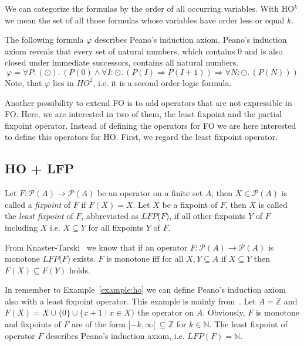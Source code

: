 We can categorize the formulas by the order of all occurring variables. With HO$^k$ we mean the set of all those
formulas whose variables have order less or equal $k$.

\begin{example}{\cite{vanBenthem2001higher}}
    \label{example:ho}
    The following formula $\varphi$ describes Peano's induction axiom. Peano's induction axiom reveals that every set
    of natural numbers, which contains $0$ and is also closed under immediate successors, contains all natural numbers.
    \[\varphi = \forall P\colon(\odot).\,(P(0) \wedge \forall I\colon\odot.\,(P(I) \Rightarrow P(I + 1)) \Rightarrow
    \forall N \colon\odot.\,(P(N)))\]
    Note, that $\varphi$ lies in $\mathit{HO}^2$, i.e. it is a second order logic formula.
\end{example}

Another possibility to extend FO is to add operators that are not expressible in FO. Here, we are interested in two
of them, the least fixpoint and the partial fixpoint operator. Instead of defining the operators for FO we are
here interested to define this operators for HO. First, we regard the least fixpoint operator.

\subsection{HO + LFP}
\label{subsec:hoPlusLfp}

\begin{definition}
   Let $F\colon \mathscr{P}(A) \rightarrow \mathscr{P}(A)$ be an operator on a finite set $A$, then $X \in \mathscr{P}
   (A)$
   is called a \emph{fixpoint} of $F$ if $F(X) = X$. Let $X$ be a fixpoint of $F$, then $X$ is called the \emph{least
   fixpoint} of $F$, abbreviated as $\mathit{LFP}$($F$), if all other fixpoints $Y$ of $F$ including $X$ i.e. $X
   \subseteq Y$ for all fixpoints $Y$ of $F$.
\end{definition}

From Knaster-Tarski~\cite{tarski1955lattice} we know that if an operator $F\colon \mathscr{P}(A) \rightarrow
\mathscr{P}(A)$ is monotone $\mathit{LFP}$($F$) exists. $F$ is monotone iff for all $X, Y \subseteq A$ if $X
\subseteq Y$ then $F(X) \subseteq F(Y)$ holds.

\begin{example}
    \label{example:lfp}
    In remember to Example~\ref{example:ho} we can define Peano's induction axiom also with a least fixpoint
    operator. This example is mainly from~\cite{hetzl2017higher}. Let $A = \mathbb{Z}$ and $F(X) = X \cup \{0\} \cup
    \{x + 1 \mid x \in X\}$ the operator on $A$. Obviously, $F$ is monotone and fixpoints of $F$ are of the form
    $[-k, \infty[~\subseteq\mathbb{Z}$ for $k \in \mathbb{N}$. The least fixpoint of operator $F$ describes Peano's
    induction axiom, i.e. $\mathit{LFP}(F) = \mathbb{N}$.
\end{example}

